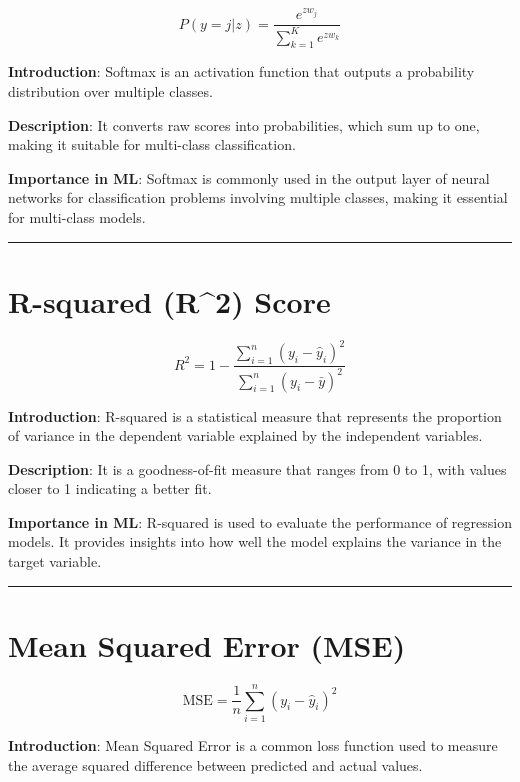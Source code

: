 \documentclass[
  12 pt,
  a4paper,
]{book}
\numberwithin{equation}{section}
\theoremstyle{plain}      %
\theoremstyle{definition} %
\theoremstyle{remark}     %
\theoremstyle{note}         %
\begin{document}
\[
P(y = j | z) = \frac{e^{z w_j}}{\sum_{k=1}^K e^{z w_k}}
\]

\textbf{Introduction}: Softmax is an activation function that outputs a
probability distribution over multiple classes.

\textbf{Description}: It converts raw scores into probabilities, which
sum up to one, making it suitable for multi-class classification.

\textbf{Importance in ML}: Softmax is commonly used in the output layer
of neural networks for classification problems involving multiple
classes, making it essential for multi-class models.

\begin{center}\rule{0.5\linewidth}{0.5pt}\end{center}

\newpage

\hypertarget{r-squared-r2-score}{%
\chapter{R-squared (R\^{}2) Score}\label{r-squared-r2-score}}

\[
R^2 = 1 - \frac{\sum_{i=1}^n (y_i - \hat{y}_i)^2}{\sum_{i=1}^n (y_i - \bar{y})^2}
\]

\textbf{Introduction}: R-squared is a statistical measure that
represents the proportion of variance in the dependent variable
explained by the independent variables.

\textbf{Description}: It is a goodness-of-fit measure that ranges from 0
to 1, with values closer to 1 indicating a better fit.

\textbf{Importance in ML}: R-squared is used to evaluate the performance
of regression models. It provides insights into how well the model
explains the variance in the target variable.

\begin{center}\rule{0.5\linewidth}{0.5pt}\end{center}

\newpage

\hypertarget{mean-squared-error-mse}{%
\chapter{Mean Squared Error (MSE)}\label{mean-squared-error-mse}}

\[
\text{MSE} = \frac{1}{n} \sum_{i=1}^n (y_i - \hat{y}_i)^2
\]

\textbf{Introduction}: Mean Squared Error is a common loss function used
to measure the average squared difference between predicted and actual
values.
\end{document}
